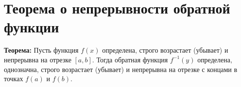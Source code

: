 \documentclass{article}
\begin{document}
\section*{Теорема о непрерывности обратной функции}

\textbf{Теорема:} Пусть функция \( f(x) \) определена, строго возрастает (убывает) и непрерывна на отрезке \([a, b]\). Тогда обратная функция \( f^{-1}(y) \) определена, однозначна, строго возрастает (убывает) и непрерывна на отрезке с концами в точках \( f(a) \) и \( f(b) \).
\end{document}

